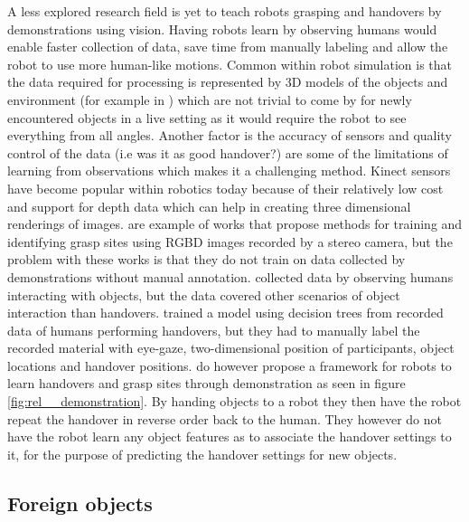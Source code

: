 A less explored research field is yet to teach robots grasping and handovers by demonstrations using vision. Having robots learn by observing humans would enable faster collection of data, save time from manually labeling and allow the robot to use more human-like motions. Common within robot simulation is that the data required for processing is represented by 3D models of the objects and environment (for example in \parencite{Miller2003}) which are not trivial to come by for newly encountered objects in a live setting as it would require the robot to see everything from all angles. Another factor is the accuracy of sensors and quality control of the data (i.e was it as good handover?) are some of the limitations of learning from observations which makes it a challenging method. Kinect sensors have become popular within robotics today because of their relatively low cost and support for depth data which can help in creating three dimensional renderings of images. \parencite{Lenz2015} \parencite{Redmon2014} \parencite{Jiang2011} \parencite{Saxena2008} are example of works that propose methods for training and identifying grasp sites using RGBD images recorded by a stereo camera, but the problem with these works is that they do not train on data collected by demonstrations without manual annotation. \textcite{Chan2014} collected data by observing humans interacting with objects, but the data covered other scenarios of object interaction than handovers. \textcite{Strabala2013} trained a model using decision trees from recorded data of humans performing handovers, but they had to manually label the recorded material with eye-gaze, two-dimensional position of participants, object locations and handover positions. \textcite{Chan2015a} do however propose a framework for robots to learn handovers and grasp sites through demonstration as seen in figure \ref{fig:rel__demonstration}. By handing objects to a robot they then have the robot repeat the handover in reverse order back to the human. They however do not have the robot learn any object features as to associate the handover settings to it, for the purpose of predicting the handover settings for new objects.


\subsection{Foreign objects}

